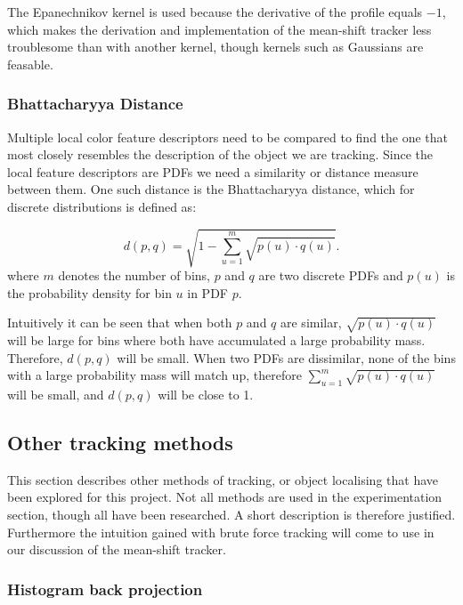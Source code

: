 \documentclass[a4paper,11pt]{article}
\begin{document}
The Epanechnikov kernel is used because the derivative of the profile equals $-1$, which makes the derivation and implementation of the mean-shift tracker less troublesome than with another kernel, though kernels such as Gaussians are feasable.

\subsubsection{Bhattacharyya Distance}

Multiple local color feature descriptors need to be compared to find the one that most closely resembles the description of the object we are tracking. Since the local feature descriptors are PDFs we need a similarity or distance measure between them. One such distance is the Bhattacharyya distance, which for discrete distributions is defined as:

\begin{equation}
\label{eq:bhattdistance}
d(p,q) = \sqrt{1-\sum_{u=1}^{m} \sqrt{p(u)\cdot q(u)}}.
\end{equation}
where $m$ denotes the number of bins, $p$ and $q$ are two discrete PDFs and $p(u)$ is the probability density for bin $u$ in PDF $p$. 

Intuitively it can be seen that when both $p$ and $q$ are similar, $\sqrt{p(u)\cdot q(u)}$ will be large for bins where both have accumulated a large probability mass. Therefore, $d(p,q)$ will be small. When two PDFs are dissimilar, none of the bins with a large probability mass will match up, therefore  $\sum_{u=1}^{m} \sqrt{p(u)\cdot q(u)}$ will be small, and $d(p,q)$ will be close to 1.

\subsection{Other tracking methods}

This section describes other methods of tracking, or object localising that have been explored for this project. Not all methods are used in the experimentation section, though all have been researched. A short description is therefore justified. Furthermore the intuition gained with brute force tracking will come to use in our discussion of the mean-shift tracker.

\subsubsection{Histogram back projection}
\end{document}
